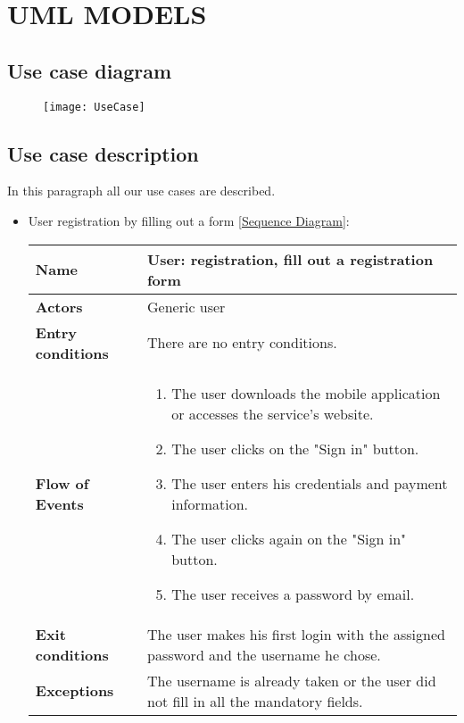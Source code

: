 \section{UML MODELS}
\subsection{Use case diagram}
\begin{figure}[H]
	\centering
	\texttt{[image: UseCase]}
\end{figure}
\newpage
\subsection{Use case description}
In this paragraph all our use cases are described.
\begin{itemize}
	\item User registration by filling out a form [\hyperlink{UserRegistration}{Sequence Diagram}]:
	\begin{table}[H]
		\centering
		\begin{tabular}{| m{3.5cm} | m{9.5cm} |}
			\hline
			\textbf{Name} & User: registration, fill out a registration form\\
			\hline
			\textbf{Actors} & Generic user\\
			\hline
			\textbf{Entry conditions} & There are no entry conditions.\\
			\hline
			\textbf{Flow of Events} & 
			\begin{enumerate}
				\item The user downloads the mobile application or accesses the service's website.
				\item The user clicks on the "Sign in" button.
				\item The user enters his credentials and payment information.
				\item The user clicks again on the "Sign in" button.
				\item The user receives a password by email.
			\end{enumerate} \\
			\hline
			\textbf{Exit conditions} & The user makes his first login with the assigned password and the username he chose.\\
			\hline
			\textbf{Exceptions} & The username is already taken or the user did not fill in all the mandatory fields. \\
			\hline
		\end{tabular}
	\end{table}

\end{itemize}
